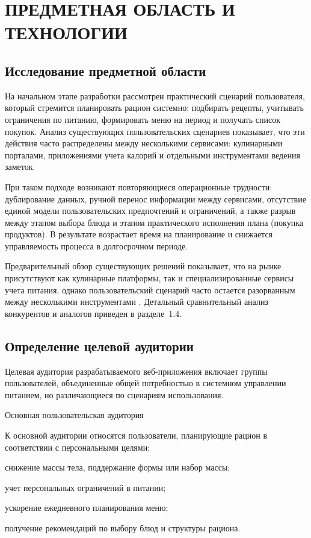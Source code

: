 \chapter{{\fontsize{14pt}{21pt}\selectfont\MakeUppercase{Предметная область и технологии}}}
\label{cha:analysis}

\section{Исследование предметной области}

На начальном этапе разработки рассмотрен практический сценарий пользователя, который стремится планировать рацион системно: подбирать рецепты, учитывать ограничения по питанию, формировать меню на период и получать список покупок. Анализ существующих пользовательских сценариев показывает, что эти действия часто распределены между несколькими сервисами: кулинарными порталами, приложениями учета калорий и отдельными инструментами ведения заметок.

При таком подходе возникают повторяющиеся операционные трудности: дублирование данных, ручной перенос информации между сервисами, отсутствие единой модели пользовательских предпочтений и ограничений, а также разрыв между этапом выбора блюда и этапом практического исполнения плана (покупка продуктов). В результате возрастает время на планирование и снижается управляемость процесса в долгосрочном периоде.

Предварительный обзор существующих решений показывает, что на рынке присутствуют как кулинарные платформы, так и специализированные сервисы учета питания, однако пользовательский сценарий часто остается разорванным между несколькими инструментами \cite{nutristeppe_diaries_2026,institutfitnesa_apps_2026,sportmaster_apps_2026}. Детальный сравнительный анализ конкурентов и аналогов приведен в разделе~1.4.

\section{Определение целевой аудитории}

Целевая аудитория разрабатываемого веб-приложения включает группы пользователей, объединенные общей потребностью в системном управлении питанием, но различающиеся по сценариям использования.

Основная пользовательская аудитория

К основной аудитории относятся пользователи, планирующие рацион в соответствии с персональными целями:
\begin{compactlist}
  \item снижение массы тела, поддержание формы или набор массы;
  \item учет персональных ограничений в питании;
  \item ускорение ежедневного планирования меню;
  \item получение рекомендаций по выбору блюд и структуры рациона.
\end{compactlist}

